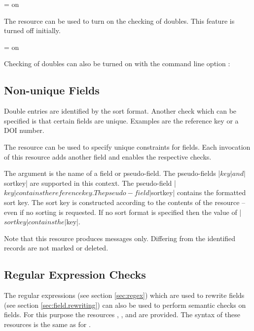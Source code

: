 \documentclass[11pt,a4paper]{scrbook}
\begin{document}
\begin{Resources}
   = on
\end{Resources}

The resource  can be used to turn on the checking of
doubles. This feature is turned off initially.

\begin{Resources}
   = on
\end{Resources}

Checking of doubles can also be turned on with the command line option
: 

\sh[d]{}

\subsection{Non-unique Fields}

Double entries are identified by the sort format. Another check which can be
specified is that certain fields are unique. Examples are the reference key
or a DOI number.

The resource  can be used to specify unique constraints for
fields. Each invocation of this resource adds another field and enables the
respective checks.

\begin{Resources}
\end{Resources}

The argument is the name of a field or pseudo-field. The pseudo-fields |$key|
and |$sortkey| are supported in this context. The pseudo-field |$key| contains
the reference key. The pseudo-field |$sortkey| contains the formatted sort
key. The sort key is constructed according to the contents of the resource
 -- even if no sorting is requested. If no sort format is
specified then the value of |$sortkey| contains the |$key|.

Note that this resource produces messages only. Differing from
 the identified records are not marked or deleted.


\subsection{Regular Expression Checks}

The regular expressions (see section \ref{sec:regex}) which are used to
rewrite fields (see section \ref{sec:field.rewriting}) can also be used to
perform semantic checks on fields. For this purpose the resources
, , and  are
provided. The syntax of these resources is the same as for .
\end{document}
